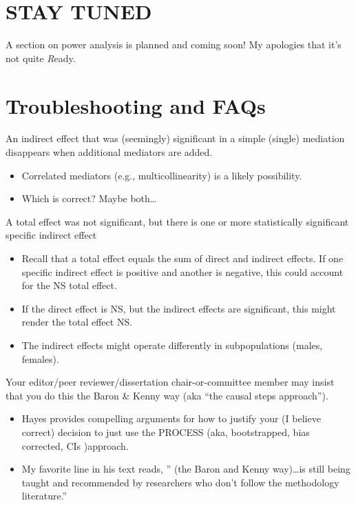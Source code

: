 \documentclass[
  11pt,
]{book}
\providecommand{\tightlist}{%
  \setlength{\itemsep}{0pt}\setlength{\parskip}{0pt}}
\begin{document}
\hypertarget{stay-tuned-1}{%
\section{STAY TUNED}\label{stay-tuned-1}}

A section on power analysis is planned and coming soon! My apologies that it's not quite \emph{R}eady.

\hypertarget{troubleshooting-and-faqs}{%
\section{Troubleshooting and FAQs}\label{troubleshooting-and-faqs}}

An indirect effect that was (seemingly) significant in a simple (single) mediation disappears when additional mediators are added.

\begin{itemize}
\tightlist
\item
  Correlated mediators (e.g., multicollinearity) is a likely possibility.
\item
  Which is correct? Maybe both\ldots{}
\end{itemize}

A total effect was not significant, but there is one or more statistically significant specific indirect effect

\begin{itemize}
\tightlist
\item
  Recall that a total effect equals the sum of direct and indirect effects. If one specific indirect effect is positive and another is negative, this could account for the NS total effect.
\item
  If the direct effect is NS, but the indirect effects are significant, this might render the total effect NS.
\item
  The indirect effects might operate differently in subpopulations (males, females).
\end{itemize}

Your editor/peer reviewer/dissertation chair-or-committee member may insist that you do this the Baron \& Kenny way (aka ``the causal steps approach'').

\begin{itemize}
\tightlist
\item
  Hayes \citep{hayes_introduction_2022} provides compelling arguments for how to justify your (I believe correct) decision to just use the PROCESS (aka, bootstrapped, bias corrected, CIs )approach.
\item
  My favorite line in his text reads, '' (the Baron and Kenny way)\ldots is still being taught and recommended by researchers who don't follow the methodology literature.''
\end{itemize}
\end{document}
